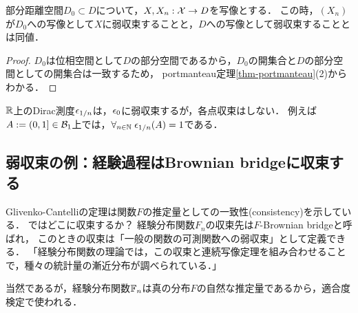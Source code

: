 \documentclass[uplatex,dvipdfmx]{jsreport}
\begin{document}
\begin{lemma}
    部分距離空間$D_0\subset D$について，$X,X_n:\mathcal{X}\to D$を写像とする．
    この時，$(X_n)$が$D_0$への写像として$X$に弱収束することと，$D$への写像として弱収束することとは同値．
\end{lemma}
\begin{proof}
    $D_0$は位相空間として$D$の部分空間であるから，$D_0$の開集合と$D$の部分空間としての開集合は一致するため，
    portmanteau定理\ref{thm-portmanteau}(2)からわかる．
\end{proof}

\begin{example}
    $\mathbb{R}$上のDirac測度$\epsilon_{1/n}$は，$\epsilon_0$に弱収束するが，各点収束はしない．
    例えば$A:=(0,1]\in\mathcal{B}_1$上では，$\forall_{n\in\mathbb{N}}\;\epsilon_{1/n}(A)=1$である．
\end{example}

\subsection{弱収束の例：経験過程はBrownian bridgeに収束する}

\begin{tcolorbox}[colframe=ForestGreen, colback=ForestGreen!10!white,breakable,colbacktitle=ForestGreen!40!white,coltitle=black,fonttitle=\bfseries\sffamily,
title=]
    Glivenko-Cantelliの定理は関数$F$の推定量としての一致性(consistency)を示している．
    ではどこに収束するか？
    経験分布関数$F_n$の収束先は$F$-Brownian bridgeと呼ばれ，
    このときの収束は「一般の関数の可測関数への弱収束」として定義できる．
    「経験分布関数の理論では，この収束と連続写像定理を組み合わせることで，種々の統計量の漸近分布が調べられている．」\cite{吉田}

    当然であるが，経験分布関数$\mathbb{F}_n$は真の分布$F$の自然な推定量であるから，適合度検定で使われる．
\end{tcolorbox}
\end{document}

